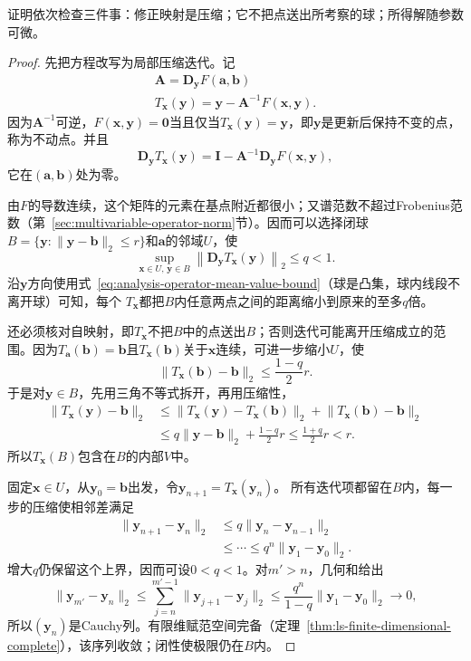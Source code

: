 证明依次检查三件事：修正映射是压缩；它不把点送出所考察的球；所得解随参数可微。
\begin{proof}
先把方程改写为局部压缩迭代。记
\[
 \begin{gathered}
\bm{A}=\bm{D}_{\bm{y}}F(\bm{a},\bm{b})\\
T_{\bm{x}}(\bm{y})=\bm{y}-\bm{A}^{-1}F(\bm{x},\bm{y}).
 \end{gathered}
\]
因为$\bm A^{-1}$可逆，$F(\bm{x},\bm{y})=\bm{0}$当且仅当$T_{\bm{x}}(\bm{y})=\bm{y}$，即$\bm y$是更新后保持不变的点，称为不动点。并且
\[
 \bm{D}_{\bm{y}}T_{\bm{x}}(\bm{y})=\bm{I}-\bm{A}^{-1}\bm{D}_{\bm{y}}F(\bm{x},\bm{y}),
\]
它在$(\bm{a},\bm{b})$处为零。

由$F$的导数连续，这个矩阵的元素在基点附近都很小；又谱范数不超过Frobenius范数（第~\ref{sec:multivariable-operator-norm}节）。因而可以选择闭球$B=\{\bm{y}:\lVert\bm{y}-\bm{b}\rVert_2\leq r\}$和$\bm{a}$的邻域$U$，使
\begin{equation}
  \sup_{\bm{x}\in U,\,\bm{y}\in B}
  \left\lVert
    \bm{D}_{\bm{y}}T_{\bm{x}}(\bm{y})
  \right\rVert_2
  \leq q<1.
\label{eq:analysis-ift-uniform-contraction}
\end{equation}
沿$\bm{y}$方向使用式~\eqref{eq:analysis-operator-mean-value-bound}（球是凸集，球内线段不离开球）可知，每个
$T_{\bm{x}}$都把$B$内任意两点之间的距离缩小到原来的至多$q$倍。

还必须核对自映射，即$T_{\bm x}$不把$B$中的点送出$B$；否则迭代可能离开压缩成立的范围。因为$T_{\bm{a}}(\bm{b})=\bm{b}$且$T_{\bm{x}}(\bm{b})$关于$\bm{x}$连续，可进一步缩小$U$，使
\[
 \lVert T_{\bm{x}}(\bm{b})-\bm{b}\rVert_2\leq\frac{1-q}{2}r.
\]
于是对$\bm{y}\in B$，先用三角不等式拆开，再用压缩性，
\[
 \begin{aligned}
  \lVert T_{\bm{x}}(\bm{y})-\bm{b}\rVert_2
  &\leq
  \lVert T_{\bm{x}}(\bm{y})-T_{\bm{x}}(\bm{b})\rVert_2+\lVert T_{\bm{x}}(\bm{b})-\bm{b}\rVert_2\\
  &\leq
  q\lVert\bm{y}-\bm{b}\rVert_2+\frac{1-q}{2}r
  \leq
  \frac{1+q}{2}r
  <r.
 \end{aligned}
\]
所以$T_{\bm{x}}(B)$包含在$B$的内部$V$中。

固定$\bm x\in U$，从$\bm y_0=\bm b$出发，令$\bm y_{n+1}=T_{\bm x}(\bm y_n)$。
所有迭代项都留在$B$内，每一步的压缩使相邻差满足
\[
 \begin{aligned}
 \lVert\bm y_{n+1}-\bm y_n\rVert_2
 &\leq q\lVert\bm y_n-\bm y_{n-1}\rVert_2\\
 &\leq\cdots\leq q^n\lVert\bm y_1-\bm y_0\rVert_2.
 \end{aligned}
\]
增大$q$仍保留这个上界，因而可设$0<q<1$。对$m'>n$，几何和给出
\[
 \lVert\bm y_{m'}-\bm y_n\rVert_2
 \leq\sum_{j=n}^{m'-1}\lVert\bm y_{j+1}-\bm y_j\rVert_2
 \leq\frac{q^n}{1-q}\lVert\bm y_1-\bm y_0\rVert_2\longrightarrow0,
\]
所以$(\bm y_n)$是Cauchy列。有限维赋范空间完备（定理~\ref{thm:ls-finite-dimensional-complete}），该序列收敛；闭性使极限仍在$B$内。


\end{proof}

